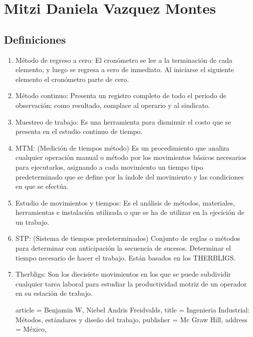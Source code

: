 \section{Mitzi Daniela Vazquez Montes}
\subsection{Definiciones}
\begin{enumerate}
    \item Método de regreso a cero: El cronómetro se lee a la terminación de cada elemento, y luego se regresa a cero de inmediato. Al iniciarse el siguiente elemento el cronómetro parte de cero.
    \item Método continuo: Presenta un registro completo de todo el periodo de observación; como resultado, complace al operario y al sindicato.
    \item Muestreo de trabajo: Es una herramienta para disminuir el costo que se presenta en el estudio continuo de tiempo.
    \item MTM: (Medición de tiempos método) Es un procedimiento que analiza cualquier operación manual o método por los movimientos básicos necesarios para ejecutarlos, asignando a cada movimiento un tiempo tipo predeterminado que se define por la índole del movimiento y las condiciones en que se efectúa.
    \item Estudio de movimientos y tiempos: Es el análisis de métodos, materiales, herramientas e instalación utilizada o que se ha de utilizar en la ejecición de un trabajo.
    \item STP: (Sistema de tiempos predeterminados) Conjunto de reglas o métodos para determinar con anticipación la secuencia de sucesos. Determinar el tiempo necesario de hacer el trabajo. Están basados en los THERBLIGS.
    \item Therbligs: Son los diecisiete movimientos en los que se puede subdividir cualquier tarea laboral para estudiar la productividad motriz de un operador en su estación de trabajo.
    
\cite{book}
  article    = {Benjamin W, Niebel Andris Freidvalds}, 
  title     = {Ingenieria Industrial: Métodos, estándares y diseño del trabajo},
  publisher = {Mc Graw Hill},
  address   = {México},
\end{enumerate}

